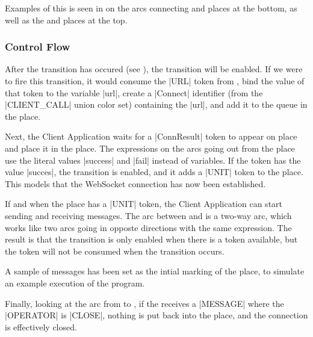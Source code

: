 		Examples of this is seen in  on the arcs connecting
		 and  places at the bottom, as well as the
		 and  places at the top.

	\subsubsection{Control Flow}
	
		After the  transition has occured (see ),
		the  transition will be enabled. If we were to fire this
		transition, it would consume the |URL| token from , bind the value of that token to the
		variable |url|, create a |Connect| identifier (from the |CLIENT_CALL| union
		color set) containing the |url|, and add it to the queue in the 
		place.
		
		Next, the Client Application waits for a |ConnResult| token to appear on
		place  and place it in the 
		place. The expressions on the arcs going out from the 
		place use the literal values |success| and |fail| instead of variables. If  the token has
		the value |succes|, the  transition is enabled, and it
		adds a |UNIT| token to the  place. This models
		that the WebSocket connection has now been established.
		
		If and when the  place has a |UNIT| token, the
		Client Application can start sending and receiving messages. The arc between
		 and  is a two-way arc, which works like two
		arcs going in opposte directions with the same expression. The result is that
		the transition is only enabled when there is a token available, but the token
		will not be consumed when the transition occurs. 
		
		A sample of messages has been set as the intial marking of the
		 place, to simulate an example execution of the program.
		
		Finally, looking at the arc from  to , if the
		 receives a |MESSAGE| where the |OPERATOR| is
		|CLOSE|, nothing is put back into the  place, and
		the connection is effectively closed.

